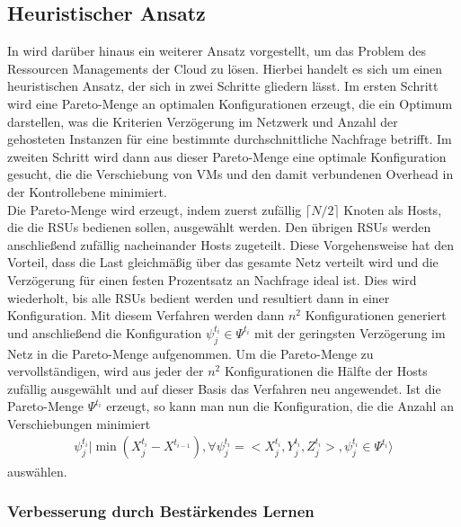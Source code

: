 \documentclass[conference]{IEEEtran}
\begin{document}
\subsection{Heuristischer Ansatz}
In \cite{IEEEhowto:orig} wird darüber hinaus ein weiterer Ansatz vorgestellt, um das Problem des Ressourcen Managements der Cloud zu lösen. Hierbei handelt es sich um einen heuristischen Ansatz, der sich in zwei Schritte gliedern lässt. Im ersten Schritt wird eine Pareto-Menge an optimalen Konfigurationen erzeugt, die ein Optimum darstellen, was die Kriterien Verzögerung im Netzwerk und Anzahl der gehosteten Instanzen für eine bestimmte durchschnittliche Nachfrage betrifft. Im zweiten Schritt wird dann aus dieser Pareto-Menge eine optimale Konfiguration gesucht, die die Verschiebung von VMs und den damit verbundenen Overhead in der Kontrollebene minimiert. \\
Die Pareto-Menge wird erzeugt, indem zuerst zufällig \(\lceil N/2 \rceil\) Knoten als Hosts, die die RSUs bedienen sollen, ausgewählt werden. Den übrigen RSUs werden anschließend zufällig nacheinander Hosts zugeteilt. Diese Vorgehensweise hat den Vorteil, dass die Last gleichmäßig über das gesamte Netz verteilt wird und die Verzögerung für einen festen Prozentsatz an Nachfrage ideal ist.
Dies wird wiederholt, bis alle RSUs bedient werden und resultiert dann in einer Konfiguration.
Mit diesem Verfahren werden dann \(n^2\) Konfigurationen generiert und anschließend die Konfiguration \(\psi_j^{t_i} \in \Psi^{t_i}\) mit der geringsten Verzögerung im Netz in die Pareto-Menge aufgenommen.
Um die Pareto-Menge zu vervollständigen, wird aus jeder der \(n^2\) Konfigurationen  die Hälfte der Hosts zufällig ausgewählt und auf dieser Basis das Verfahren neu angewendet. 
Ist die Pareto-Menge \(\Psi^{t_i}\) erzeugt, so kann man nun die Konfiguration, die die Anzahl an Verschiebungen minimiert 
\begin{align*}
\psi_{j}^{t_i}|\min(X_{j}^{t_i}-X^{t_{i-1}}),\forall \psi_{j}^{t_i}=<X_{j}^{t_i},Y_{j}^{t_i},Z_{j}^{t_i}>, \psi_{j}^{t_i} \in \Psi^{t_i}  \rangle 
\end{align*} 
auswählen.


\subsubsection{Verbesserung durch Bestärkendes Lernen}
\end{document}
